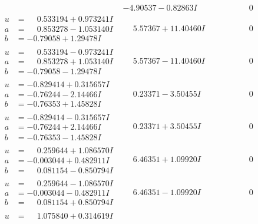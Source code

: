 \documentclass[1p]{elsarticle_modified}
\theoremstyle{definition}
\begin{document}
$$\begin{array}{c|c|c}
 & -4.90537 - 0.82863 I & \phantom{-0.000000 } 0 \\ \hline\begin{aligned}
u &= \phantom{-}0.533194 + 0.973241 I \\
a &= \phantom{-}0.853278 - 1.053140 I \\
b &= -0.79058 + 1.29478 I\end{aligned}
 & \phantom{-}5.57367 + 11.40460 I & \phantom{-0.000000 } 0 \\ \hline\begin{aligned}
u &= \phantom{-}0.533194 - 0.973241 I \\
a &= \phantom{-}0.853278 + 1.053140 I \\
b &= -0.79058 - 1.29478 I\end{aligned}
 & \phantom{-}5.57367 - 11.40460 I & \phantom{-0.000000 } 0 \\ \hline\begin{aligned}
u &= -0.829414 + 0.315657 I \\
a &= -0.76244 - 2.14466 I \\
b &= -0.76353 + 1.45828 I\end{aligned}
 & \phantom{-}0.23371 - 3.50455 I & \phantom{-0.000000 } 0 \\ \hline\begin{aligned}
u &= -0.829414 - 0.315657 I \\
a &= -0.76244 + 2.14466 I \\
b &= -0.76353 - 1.45828 I\end{aligned}
 & \phantom{-}0.23371 + 3.50455 I & \phantom{-0.000000 } 0 \\ \hline\begin{aligned}
u &= \phantom{-}0.259644 + 1.086570 I \\
a &= -0.003044 + 0.482911 I \\
b &= \phantom{-}0.081154 - 0.850794 I\end{aligned}
 & \phantom{-}6.46351 + 1.09920 I & \phantom{-0.000000 } 0 \\ \hline\begin{aligned}
u &= \phantom{-}0.259644 - 1.086570 I \\
a &= -0.003044 - 0.482911 I \\
b &= \phantom{-}0.081154 + 0.850794 I\end{aligned}
 & \phantom{-}6.46351 - 1.09920 I & \phantom{-0.000000 } 0 \\ \hline\begin{aligned}
u &= \phantom{-}1.075840 + 0.314619 I \\

\end{aligned}
\end{array}$$
\end{document}
